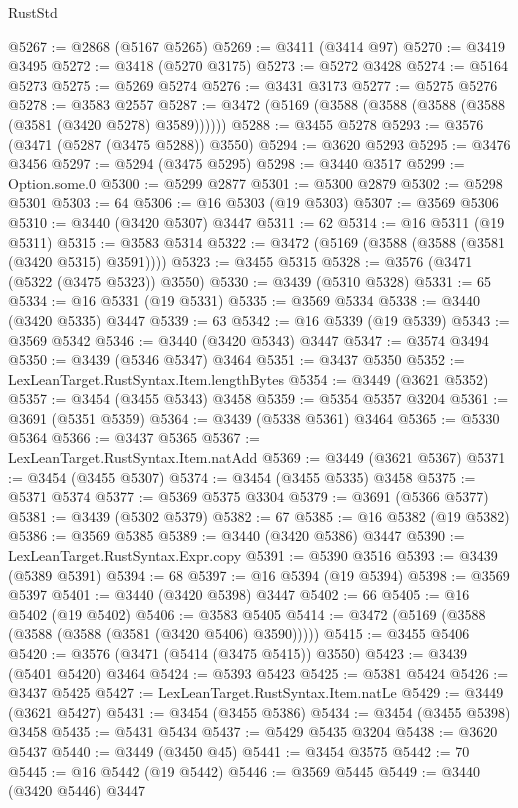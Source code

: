 \begin{lexlean}{RustStd}
\begin{coremodule}
{{{{{{{{{{{{{{{{{{{@5267 := @2868 (@5167 @5265)
@5269 := @3411 (@3414 @97)
@5270 := @3419 @3495
@5272 := @3418 (@5270 @3175)
@5273 := @5272 @3428
@5274 := @5164 @5273
@5275 := @5269 @5274
@5276 := @3431 @3173
@5277 := @5275 @5276
@5278 := @3583 @2557
@5287 := @3472 (@5169 (@3588 (@3588 (@3588 (@3588 (@3581 (@3420 @5278) @3589))))))
@5288 := @3455 @5278
@5293 := @3576 (@3471 (@5287 (@3475 @5288)) @3550)
@5294 := @3620 @5293
@5295 := @3476 @3456
@5297 := @5294 (@3475 @5295)
@5298 := @3440 @3517
@5299 := Option.some.{0}
@5300 := @5299 @2877
@5301 := @5300 @2879
@5302 := @5298 @5301
@5303 := 64
@5306 := @16 @5303 (@19 @5303)
@5307 := @3569 @5306
@5310 := @3440 (@3420 @5307) @3447
@5311 := 62
@5314 := @16 @5311 (@19 @5311)
@5315 := @3583 @5314
@5322 := @3472 (@5169 (@3588 (@3588 (@3581 (@3420 @5315) @3591))))
@5323 := @3455 @5315
@5328 := @3576 (@3471 (@5322 (@3475 @5323)) @3550)
@5330 := @3439 (@5310 @5328)
@5331 := 65
@5334 := @16 @5331 (@19 @5331)
@5335 := @3569 @5334
@5338 := @3440 (@3420 @5335) @3447
@5339 := 63
@5342 := @16 @5339 (@19 @5339)
@5343 := @3569 @5342
@5346 := @3440 (@3420 @5343) @3447
@5347 := @3574 @3494
@5350 := @3439 (@5346 @5347) @3464
@5351 := @3437 @5350
@5352 := LexLeanTarget.RustSyntax.Item.lengthBytes
@5354 := @3449 (@3621 @5352)
@5357 := @3454 (@3455 @5343) @3458
@5359 := @5354 @5357 @3204
@5361 := @3691 (@5351 @5359)
@5364 := @3439 (@5338 @5361) @3464
@5365 := @5330 @5364
@5366 := @3437 @5365
@5367 := LexLeanTarget.RustSyntax.Item.natAdd
@5369 := @3449 (@3621 @5367)
@5371 := @3454 (@3455 @5307)
@5374 := @3454 (@3455 @5335) @3458
@5375 := @5371 @5374
@5377 := @5369 @5375 @3304
@5379 := @3691 (@5366 @5377)
@5381 := @3439 (@5302 @5379)
@5382 := 67
@5385 := @16 @5382 (@19 @5382)
@5386 := @3569 @5385
@5389 := @3440 (@3420 @5386) @3447
@5390 := LexLeanTarget.RustSyntax.Expr.copy
@5391 := @5390 @3516
@5393 := @3439 (@5389 @5391)
@5394 := 68
@5397 := @16 @5394 (@19 @5394)
@5398 := @3569 @5397
@5401 := @3440 (@3420 @5398) @3447
@5402 := 66
@5405 := @16 @5402 (@19 @5402)
@5406 := @3583 @5405
@5414 := @3472 (@5169 (@3588 (@3588 (@3588 (@3581 (@3420 @5406) @3590)))))
@5415 := @3455 @5406
@5420 := @3576 (@3471 (@5414 (@3475 @5415)) @3550)
@5423 := @3439 (@5401 @5420) @3464
@5424 := @5393 @5423
@5425 := @5381 @5424
@5426 := @3437 @5425
@5427 := LexLeanTarget.RustSyntax.Item.natLe
@5429 := @3449 (@3621 @5427)
@5431 := @3454 (@3455 @5386)
@5434 := @3454 (@3455 @5398) @3458
@5435 := @5431 @5434
@5437 := @5429 @5435 @3204
@5438 := @3620 @5437
@5440 := @3449 (@3450 @45)
@5441 := @3454 @3575
@5442 := 70
@5445 := @16 @5442 (@19 @5442)
@5446 := @3569 @5445
@5449 := @3440 (@3420 @5446) @3447
}}}}}}}}}}}}}}}}}}}
\end{coremodule}
\end{lexlean}
